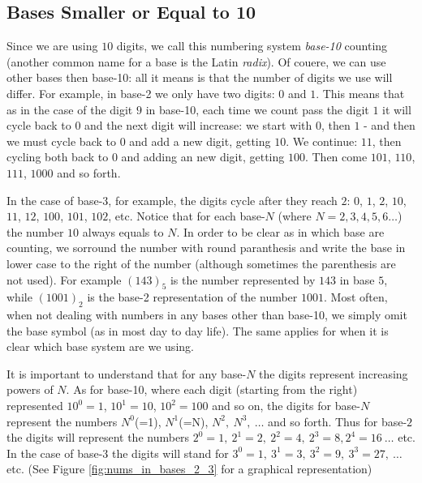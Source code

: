 \subsection{Bases Smaller or Equal to 10}
Since we are using $10$ digits, we call this numbering system \textit{base-10} counting (another common name for a base is the Latin \textit{radix}). Of couere, we can use other bases then base-10: all it means is that the number of digits we use will differ. For example, in base-2 we only have two digits: $0$ and $1$. This means that as in the case of the digit $9$ in base-10, each time we count pass the digit $1$ it will cycle back to $0$ and the next digit will increase: we start with $0$, then $1$ - and then we must cycle back to $0$ and add a new digit, getting $10$. We continue: $11$, then cycling both back to $0$ and adding an new digit, getting $100$. Then come $101$, $110$, $111$, $1000$ and so forth. \par

In the case of base-3, for example, the digits cycle after they reach $2$: $0$, $1$, $2$, $10$, $11$, $12$, $100$, $101$, $102$, etc. Notice that for each base-$N$ (where $N=2,3,4,5,6\dots$) the number $10$ always equals to $N$. In order to be clear as in which base are counting, we sorround the number with round paranthesis and write the base in lower case to the right of the number (although sometimes the parenthesis are not used). For example $\left(143\right)_{5}$ is the number represented by $143$ in base $5$, while $\left(1001\right)_{2}$ is the base-2 representation of the number $1001$. Most often, when not dealing with numbers in any bases other than base-10, we simply omit the base symbol (as in most day to day life). The same applies for when it is clear which base system are we using.

It is important to understand that for any base-$N$ the digits represent increasing powers of $N$. As for base-10, where each digit (starting from the right) represented $10^{0}=1$, $10^{1}=10$, $10^{2}=100$ and so on, the digits for base-$N$ represent the numbers $N^{0}$(=1), $N^{1}$(=N), $N^{2},\ N^{3},\ \dots$ and so forth. Thus for base-$2$ the digits will represent the numbers $2^{0}=1,\ 2^{1}=2,\ 2^{2}=4,\ 2^{3}=8, 2^{4}=16\ \dots$ etc. In the case of base-$3$ the digits will stand for $3^{0}=1,\ 3^{1}=3,\ 3^{2}=9,\ 3^{3}=27,\ \dots$ etc. (See Figure \ref{fig:nums_in_bases_2_3} for a graphical representation)

